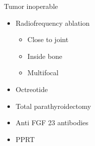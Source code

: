 \documentclass[compress]{beamer}
\begin{document}
\begin{frame}{ Tumor inoperable \emojicry }
	\begin{itemize}
		\item Radiofrequency ablation 
		\begin{itemize}
			\item Close to joint
			\item Inside bone
			\item Multifocal
		\end{itemize}
		\item Octreotide
		\item Total parathyroidectomy 
		\item Anti FGF 23 antibodies 
		\item PPRT
	
	\end{itemize}
\end{frame} 
\end{document}
